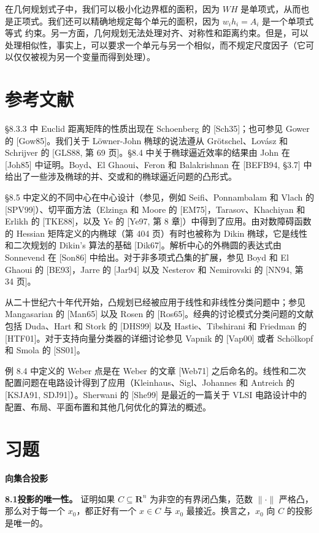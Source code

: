 \documentclass[UTF8, 12pt, fontset=fandol, oneside]{ctexart}
\begin{document}
在几何规划式子中，我们可以极小化边界框的面积，因为 $WH$ 是单项式，从而也是正项式。我们还可以精确地规定每个单元的面积，因为 $w_ih_i=A_i$ 是一个单项式等式
约束。另一方面，几何规划无法处理对齐、对称性和距离约束。但是，可以处理相似性，事实上，可以要求一个单元与另一个相似，而不规定尺度因子（它可以仅仅被视为另一个变量而得到处理）。

\section*{参考文献}

\S 8.3.3 中 Euclid 距离矩阵的性质出现在 Schoenberg 的 [Sch35]；也可参见 Gower 的 [Gow85]。我们关于 Löwner-John 椭球的说法遵从 Grötschel、Lovász 和 Schrijver 的 [GLS88, 第 69 页]。\S 8.4 中关于椭球逼近效率的结果由 John 在 [Joh85] 中证明。Boyd、El Ghaoui、Feron 和 Balakrishnan 在 [BEFB94, \S 3.7] 中给出了一些涉及椭球的并、交或和的椭球逼近问题的凸形式。

\S 8.5 中定义的不同中心在中心设计（参见，例如 Seifi、Ponnambalam 和 Vlach 的 [SPV99]）、切平面方法（Elzinga 和 Moore 的 [EM75]，Tarasov、Khachiyan 和 Erlikh 的 [TKE88]，以及 Ye 的 [Ye97, 第 8 章]）中得到了应用。由对数障碍函数的 Hessian 矩阵定义的内椭球（第 404 页）有时也被称为 Dikin 椭球，它是线性和二次规划的 Dikin's 算法的基础 [Dik67]。解析中心的外椭圆的表达式由 Sonnevend 在 [Son86] 中给出。对于非多项式凸集的扩展，参见 Boyd 和 El Ghaoui 的 [BE93]，Jarre 的 [Jar94] 以及 Nesterov 和 Nemirovski 的 [NN94, 第 34 页]。

从二十世纪六十年代开始，凸规划已经被应用于线性和非线性分类问题中；参见 Mangasarian 的 [Man65] 以及 Rosen 的 [Ros65]。经典的讨论模式分类问题的文献包括 Duda、Hart 和 Stork
的 [DHS99] 以及 Hastie、Tibshirani 和 Friedman 的 [HTF01]。对于支持向量分类器的详细讨论参见 Vapnik 的 [Vap00] 或者 Schölkopf 和 Smola 的 [SS01]。

例 8.4 中定义的 Weber 点是在 Weber 的文章 [Web71] 之后命名的。线性和二次配置问题在电路设计得到了应用（Kleinhaus、Sigl、Johannes 和 Antreich 的 [KSJA91, SDJ91]）。Sherwani 的 [She99] 是最近的一篇关于 VLSI 电路设计中的配置、布局、平面布置和其他几何优化的算法的概述。

\section*{习题}

\noindent\textbf{向集合投影}

\noindent\textbf{8.1\quad 投影的唯一性。}
证明如果 $C\subseteq\mathbf{R}^n$ 为非空的有界闭凸集，范数 $\|\cdot\|$ 严格凸，那么对于每一个 $x_0$，都正好有一个 $x\in C$ 与 $x_0$ 最接近。换言之，$x_0$ 向 $C$ 的投影是唯一的。
\end{document}
